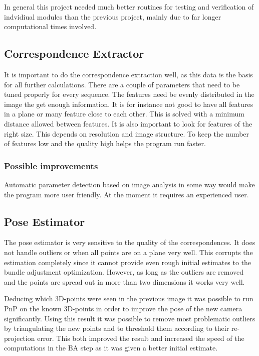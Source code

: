 In general this project needed much better routines for testing and verification of indvidiual modules than the previous project, mainly due to far longer computational times involved.

\subsection{Correspondence Extractor}
It is important to do the correspondence extraction well, as this data is the basis for all further calculations. There are a couple of parameters that need to be tuned properly for every sequence. The features need be evenly distributed in the image the get enough information. It is for instance not good to have all features in a plane or many feature close to each other. This is solved with a minimum distance allowed between features. It is also important to look for features of the right size. This depends on resolution and image structure. To keep the number of features low and the quality high helps the program run faster. 

\subsubsection{Possible improvements}
Automatic parameter detection based on image analysis in some way would make the program more user friendly. At the moment it requires an experienced user. 

\subsection{Pose Estimator}
The pose estimator is very sensitive to the quality of the correspondences. It does not handle outliers or when all points are on a plane very well. This corrupts the estimation completely since it cannot provide even rough initial estimates to the bundle adjustment optimization. However, as long as the outliers are removed and the points are spread out in more than two dimensions it works very well. 

Deducing which 3D-points were seen in the previous image it was possible to run PnP on the known 3D-points in order to improve the pose of the new camera significantly. Using this result it was possible to remove most problematic outliers by triangulating the new points and to threshold them according to their re-projection error. This both improved the result and increased the speed of the computations in the BA step as it was given a better initial estimate.

